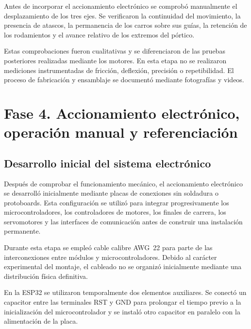 Antes de incorporar el accionamiento electrónico se comprobó manualmente el desplazamiento de los tres ejes. Se verificaron la continuidad del movimiento, la presencia de atascos, la permanencia de los carros sobre sus guías, la retención de los rodamientos y el avance relativo de los extremos del pórtico.

Estas comprobaciones fueron cualitativas y se diferenciaron de las pruebas posteriores realizadas mediante los motores. En esta etapa no se realizaron mediciones instrumentadas de fricción, deflexión, precisión o repetibilidad. El proceso de fabricación y ensamblaje se documentó mediante fotografías y videos.




\section{Fase 4. Accionamiento electrónico, operación manual y referenciación}

\subsection{Desarrollo inicial del sistema electrónico}

Después de comprobar el funcionamiento mecánico, el accionamiento electrónico se desarrolló inicialmente mediante placas de conexiones sin soldadura o protoboards. Esta configuración se utilizó para integrar progresivamente los microcontroladores, los controladores de motores, los finales de carrera, los servomotores y las interfaces de comunicación antes de construir una instalación permanente.

Durante esta etapa se empleó cable calibre AWG~22 para parte de las interconexiones entre módulos y microcontroladores. Debido al carácter experimental del montaje, el cableado no se organizó inicialmente mediante una distribución física definitiva.

En la ESP32 se utilizaron temporalmente dos elementos auxiliares. Se conectó un capacitor entre las terminales RST y GND para prolongar el tiempo previo a la inicialización del microcontrolador y se instaló otro capacitor en paralelo con la alimentación de la placa.

